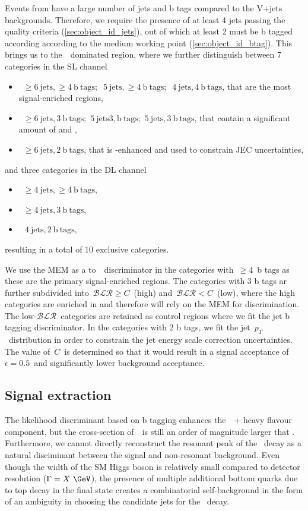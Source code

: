 Events from \ttHbb have a large number of jets and b tags compared to the V+jets backgrounds. Therefore, we require the presence of at least 4 jets passing the quality criteria (\cref{sec:object_id_jets}), out of which at least 2 must be b tagged according according to the medium working point (\cref{sec:object_id_btag}). This brings us to the~\ttbar~dominated region, where we further distinguish between 7 categories in the SL channel
\begin{itemize}
\item~$\ge 6~\mathrm{jets},\ge 4~\mathrm{b~tags}$;~$~5~\mathrm{jets},\ge 4~\mathrm{b~tags}$;~$~4~\mathrm{jets},4~\mathrm{b~tags}$, that are the most signal-enriched regions,
\item~$\ge 6~\mathrm{jets},3~\mathrm{b~tags}$;~$5~\mathrm{jets} 3,\mathrm{b~tags}$;~$5~\mathrm{jets},3~\mathrm{b~tags}$, that contain a significant amount of \ttcc and \ttbb,
\item~$\ge 6~\mathrm{jets},2~\mathrm{b~tags}$, that is \ttlf-enhanced and used to constrain JEC uncertainties,
\end{itemize}
and three categories in the DL channel
\begin{itemize}
\item~$\ge 4~\mathrm{jets},\ge 4~\mathrm{b~tags}$,
\item~$\ge 4~\mathrm{jets},3~\mathrm{b~tags}$,
\item~$~4~\mathrm{jets},2~\mathrm{b~tags}$,
\end{itemize}
resulting in a total of 10 exclusive categories.

We use the MEM as a \ttHbb to~\ttbb~discriminator in the categories with~$\ge 4$~b tags as these are the primary signal-enriched regions. The categories with 3 b tags ar further subdivided into~$\mathcal{BLR} \ge C$~(high) and~$\mathcal{BLR} < C$~(low), where the high categories are enriched in \ttHbb and therefore will rely on the MEM for discrimination. The low-$\mathcal{BLR}$~categories are retained as control regions where we fit the jet b tagging discriminator. In the categories with 2 b tags, we fit the jet~$p_T$~distribution in order to constrain the jet energy scale correction uncertainties. The value of~$C$~is determined so that it would result in a signal acceptance of~$\epsilon = 0.5$~and significantly lower background acceptance.

\subsection{Signal extraction}
\label{sec:mem_application}
The likelihood discriminant based on b tagging enhances the~\ttbar~+ heavy flavour component, but the cross-section of~\ttbb~is still an order of magnitude larger that \ttHbb. Furthermore, we cannot directly reconstruct the resonant peak of the \Hbb~decay as a natural disciminant between the signal and non-resonant background. Even though the width of the SM Higgs boson is relatively small compared to detector resolution ($\Gamma = X~\GeV$), the presence of multiple additional bottom quarks due to top decay in the final state creates a combinatorial self-background in the form of an ambiguity in choosing the candidate jets for the \Hbb~decay.

